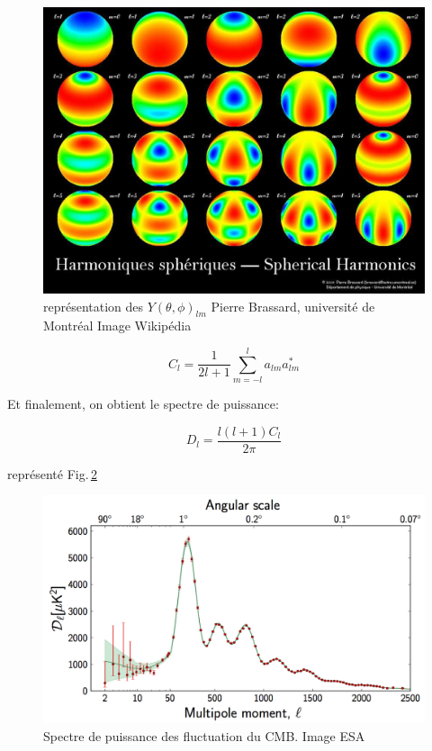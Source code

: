 \begin{figure}[bth]
        \includegraphics[width=.95\linewidth]{img/01/harmoniques_spheriques.jpeg} 
        \caption{
        représentation des $Y(\theta,\phi)_{lm}$
 Pierre Brassard, université de Montréal 
        Image Wikipédia}
 		\label{fig:harmoniques_spheriques}
\end{figure}


\begin{equation}
C_l = \frac{1}{2l+1} \sum_{m=-l}^l a_{lm} a_{lm}^*
\end{equation}


Et finalement, on obtient le spectre de puissance:

\begin{equation}
D_l = \frac{l (l+1) C_l }{2 \pi} 
\end{equation}

représenté Fig.\,\ref{fig:cmb_power_spectrum}

\begin{figure}[bth]
        \includegraphics[width=.95\linewidth]{img/01/CMB_power_spectrum.png} 
        \caption{Spectre de puissance des fluctuation du CMB.
        Image ESA}
 		\label{fig:cmb_power_spectrum}
\end{figure}


